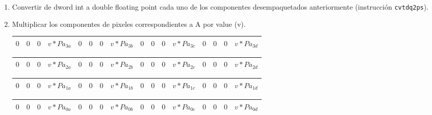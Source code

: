 \begin{enumerate}
\begin{tabular}{| g | g | g | g | g | g | g | g | g | g | g | g | g | g | g | g |}
\hline
$0$ & $0$ & $0$ & $Pb_{1a}$ & $0$ & $0$ & $0$ & $Pb_{1b}$ & $0$ & $0$ & $0$ & $Pb_{1c}$ & $0$ & $0$ & $0$ & $Pb_{1d}$\\ 
\hline
\end{tabular}

\begin{tabular}{| g | g | g | g | g | g | g | g | g | g | g | g | g | g | g | g |}
\hline
$0$ & $0$ & $0$ & $Pb_{0a}$ & $0$ & $0$ & $0$ & $Pb_{0b}$ & $0$ & $0$ & $0$ & $Pb_{0c}$ & $0$ & $0$ & $0$ & $Pb_{0d}$ \\ 
\hline
\end{tabular}

\item Convertir de dword int a double floating point cada uno de los componentes desempaquetados anteriormente (instrucción \texttt{cvtdq2ps}).
\item Multiplicar los componentes de pixeles correspondientes a A por value (v).

\begin{tabular}{| o | o | o | o | o | o | o | o | o | o | o | o | o | o | o | o |} %
\hline
$0$ & $0$ & $0$ & $v * Pa_{3a}$ & $0$ & $0$ & $0$ & $v * Pa_{3b}$ & $0$ & $0$ & $0$ & $v * Pa_{3c}$ & $0$ & $0$ & $0$ & $v * Pa_{3d}$ \\ 
\hline
\end{tabular}

\begin{tabular}{| o | o | o | o | o | o | o | o | o | o | o | o | o | o | o | o |} %
\hline
$0$ & $0$ & $0$ & $v * Pa_{2a}$ & $0$ & $0$ & $0$ & $v * Pa_{2b}$ & $0$ & $0$ & $0$ & $v * Pa_{2c}$ & $0$ & $0$ & $0$ & $v * Pa_{2d}$ \\ 
\hline
\end{tabular}

\begin{tabular}{| o | o | o | o | o | o | o | o | o | o | o | o | o | o | o | o |} %
\hline
$0$ & $0$ & $0$ & $v * Pa_{1a}$ & $0$ & $0$ & $0$ & $v * Pa_{1b}$ & $0$ & $0$ & $0$ & $v * Pa_{1c}$ & $0$ & $0$ & $0$ & $v * Pa_{1d}$\\ 
\hline
\end{tabular}

\begin{tabular}{| o | o | o | o | o | o | o | o | o | o | o | o | o | o | o | o |} %
\hline
$0$ & $0$ & $0$ & $v * Pa_{0a}$ & $0$ & $0$ & $0$ & $v * Pa_{0b}$ & $0$ & $0$ & $0$ & $v * Pa_{0c}$ & $0$ & $0$ & $0$ & $v * Pa_{0d}$ \\ 
\hline
\end{tabular}


\end{enumerate}
